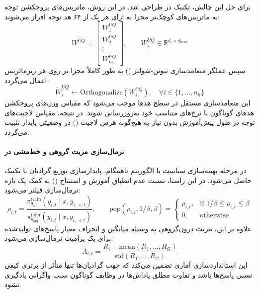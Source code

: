 برای حل این چالش، تکنیک  در  طراحی شد. در این روش، ماتریس‌های پروجکشن توجه به ماتریس‌های کوچک‌تر مجزا به ازای هر یک از ۶۴ هد توجه افراز می‌شوند:
\begin{equation}
    W^{UQ} = \begin{bmatrix} W_1^{UQ} \\ W_2^{UQ} \\ \vdots \\ W_{n_h}^{UQ} \end{bmatrix}, \qquad W_i^{UQ} \in \mathbb{R}^{d_c \times d_{\text{head}}}
\end{equation}
سپس عملگر متعامدسازی نیوتن-شولتز () به طور کاملاً مجزا بر روی هر زیرماتریس اعمال می‌گردد:
\begin{equation}
    \tilde{W}_i^{UQ} \leftarrow \text{Orthogonalize}(W_i^{UQ}), \quad \forall i \in \{1, \dots, n_h\}
\end{equation}
این متعامدسازی مستقل در سطح هدها موجب می‌شود که مقیاس وزن‌های پروجکشن هدهای گوناگون با نرخ‌های متناسب خود به‌روزرسانی شوند. در نتیجه، مقیاس لاجیت‌های توجه در طول پیش‌آموزش بدون نیاز به هیچ‌گونه هرس لاجیت () در وضعیتی پایدار تثبیت می‌گردد.

\paragraph*{نرمال‌سازی مزیت گروهی و خط‌مشی در }
در مرحله بهینه‌سازی سیاست با الگوریتم  ناهمگام، پایدارسازی توزیع گرادیان با تکنیک  حاصل می‌شود. در این راستا، نسبت عدم انطباق آموزش و استنتاج () به کمک یک بازه نرمال‌سازی فیلتر می‌شود:
\begin{equation}
    \rho_{i,t} = \frac{\pi_{\theta_{\text{old}}}^{\text{train}}(y_{i,t} \mid x, y_{i,<t})}{\pi_{\theta_{\text{old}}}^{\text{infer}}(y_{i,t} \mid x, y_{i,<t})}, \qquad \text{pop}(\rho_{i,t}, 1/\beta, \beta) = \begin{cases} 
        \rho_{i,t}, & \text{if } 1/\beta \le \rho_{i,t} \le \beta \\ 
        0, & \text{otherwise} 
    \end{cases}
\end{equation}
علاوه بر این، مزیت درون‌گروهی به وسیله میانگین و انحراف معیار پاسخ‌های تولیدشده برای یک پرامپت نرمال‌سازی می‌شود:
\begin{equation}
    \hat{A}_{i,t} = \frac{R_i - \text{mean}(R_1, \dots, R_G)}{\text{std}(R_1, \dots, R_G)}
\end{equation}
این استانداردسازی آماری تضمین می‌کند که جهت گرادیان‌ها تنها متأثر از برتری کیفی نسبی پاسخ‌ها باشد و تفاوت مطلق پاداش‌ها در وظایف گوناگون سبب واگرایی یادگیری نشود.

